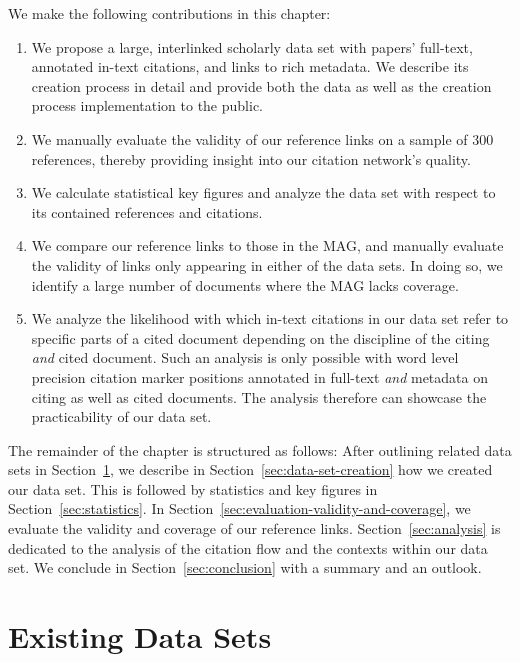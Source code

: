 We make the following contributions in this chapter:
\begin{enumerate}
    \item We propose a large, interlinked scholarly data set with papers' full-text, annotated in-text citations, and links to rich metadata. We describe its creation process in detail and provide both the data as well as the creation process implementation to the public. 
    \item We manually evaluate the validity of our reference links on a sample of 300 references, thereby providing insight into our citation network's quality.
    \item We calculate statistical key figures and analyze the data set with respect to its contained references and citations.
    \item We compare our reference links to those in the MAG, and manually evaluate the validity of links only appearing in either of the data sets. In doing so, we identify a large number of documents where the MAG lacks coverage.
    \item We analyze the likelihood with which in-text citations in our data set refer to specific parts of a cited document depending on the discipline of the citing \emph{and} cited document. Such an analysis is only possible with word level precision citation marker positions annotated in full-text \emph{and} metadata on citing as well as cited documents. The analysis therefore can showcase the practicability of our data set.
\end{enumerate}

The remainder of the chapter is structured as follows: After outlining related data sets in Section~\ref{sec:related-work}, we describe in Section~\ref{sec:data-set-creation} how we created our data set. This is followed by statistics and key figures in Section~\ref{sec:statistics}. In Section~\ref{sec:evaluation-validity-and-coverage}, we evaluate the validity and coverage of our reference links. Section~\ref{sec:analysis} is dedicated to the analysis of the citation flow and the contexts within our data set. We conclude in Section~\ref{sec:conclusion} with a summary and an outlook.

\section{Existing Data Sets}
\label{sec:related-work}

